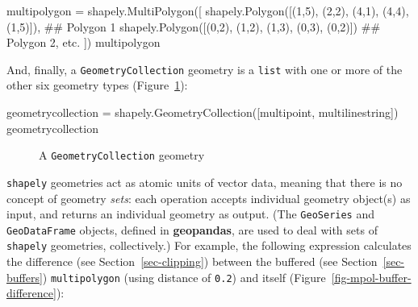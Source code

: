\documentclass[
  letterpaper,
]{krantz}
\newenvironment{Shaded}{\begin{snugshade}}{\end{snugshade}}
\newcommand{\CommentTok}[1]{\textcolor[rgb]{0.37,0.37,0.37}{#1}}
\newcommand{\DecValTok}[1]{\textcolor[rgb]{0.68,0.00,0.00}{#1}}
\newcommand{\NormalTok}[1]{\textcolor[rgb]{0.00,0.23,0.31}{#1}}
\newcommand{\OperatorTok}[1]{\textcolor[rgb]{0.37,0.37,0.37}{#1}}
\begin{document}
\begin{Shaded}
\begin{Highlighting}[]
\NormalTok{multipolygon }\OperatorTok{=}\NormalTok{ shapely.MultiPolygon([}
\NormalTok{    shapely.Polygon([(}\DecValTok{1}\NormalTok{,}\DecValTok{5}\NormalTok{), (}\DecValTok{2}\NormalTok{,}\DecValTok{2}\NormalTok{), (}\DecValTok{4}\NormalTok{,}\DecValTok{1}\NormalTok{), (}\DecValTok{4}\NormalTok{,}\DecValTok{4}\NormalTok{), (}\DecValTok{1}\NormalTok{,}\DecValTok{5}\NormalTok{)]),  }\CommentTok{\#\# Polygon 1 }
\NormalTok{    shapely.Polygon([(}\DecValTok{0}\NormalTok{,}\DecValTok{2}\NormalTok{), (}\DecValTok{1}\NormalTok{,}\DecValTok{2}\NormalTok{), (}\DecValTok{1}\NormalTok{,}\DecValTok{3}\NormalTok{), (}\DecValTok{0}\NormalTok{,}\DecValTok{3}\NormalTok{), (}\DecValTok{0}\NormalTok{,}\DecValTok{2}\NormalTok{)])   }\CommentTok{\#\# Polygon 2, etc.}
\NormalTok{])}
\NormalTok{multipolygon}
\end{Highlighting}
\end{Shaded}

And, finally, a
\texttt{\textquotesingle{}GeometryCollection\textquotesingle{}} geometry
is a \texttt{list} with one or more of the other six geometry types
(Figure~\ref{fig-geometrycollection}):

\begin{Shaded}
\begin{Highlighting}[]
\NormalTok{geometrycollection }\OperatorTok{=}\NormalTok{ shapely.GeometryCollection([multipoint, multilinestring])}
\NormalTok{geometrycollection}
\end{Highlighting}
\end{Shaded}

\begin{figure}[H]


\caption{\label{fig-geometrycollection}A \texttt{GeometryCollection}
geometry}

\end{figure}%

\texttt{shapely} geometries act as atomic units of vector data, meaning
that there is no concept of geometry \emph{sets}: each operation accepts
individual geometry object(s) as input, and returns an individual
geometry as output. (The \texttt{GeoSeries} and \texttt{GeoDataFrame}
objects, defined in \textbf{geopandas}, are used to deal with sets of
\texttt{shapely} geometries, collectively.) For example, the following
expression calculates the difference (see Section~\ref{sec-clipping})
between the buffered (see Section~\ref{sec-buffers})
\texttt{multipolygon} (using distance of \texttt{0.2}) and itself
(Figure~\ref{fig-mpol-buffer-difference}):
\end{document}
